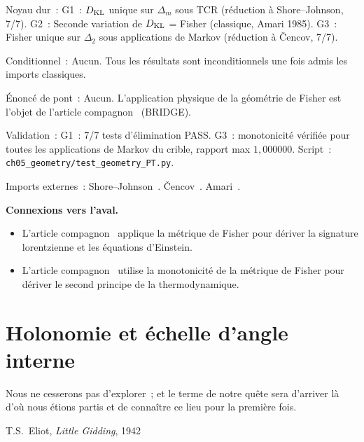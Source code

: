 \documentclass[12pt,a4paper]{article}
\begin{document}
\begin{ledgerbox}
Noyau dur~:
  G1~: $D_{\rm KL}$ unique sur $\Delta_m$ sous TCR (réduction à
  Shore--Johnson, 7/7).
  G2~: Seconde variation de $D_{\rm KL}$ = Fisher (classique,
  Amari 1985).
  G3~: Fisher unique sur $\Delta_2$ sous applications de Markov
  (réduction à \v{C}encov, 7/7).

Conditionnel~:
  Aucun. Tous les résultats sont inconditionnels une fois admis les
  imports classiques.

Énoncé de pont~:
  Aucun. L'application physique de la géométrie de Fisher est
  l'objet de l'article compagnon~\cite{companion_physics} (BRIDGE).

Validation~:
  G1~: 7/7 tests d'élimination PASS.
  G3~: monotonicité vérifiée pour toutes les applications de Markov
  du crible, rapport max $1{,}000000$.
  Script~: \texttt{ch05\_geometry/test\_geometry\_PT.py}.

Imports externes~:
  Shore--Johnson~\cite{ShoreJohnson1980}.
  \v{C}encov~\cite{Cencov1982}.
  Amari~\cite{Amari1985}.
\end{ledgerbox}

\medskip\noindent\textbf{Connexions vers l'aval.}
\begin{itemize}
\item L'article compagnon~\cite{companion_physics} applique la
  métrique de Fisher pour dériver la signature lorentzienne et les
  équations d'Einstein.
\item L'article compagnon~\cite{companion_physics} utilise la
  monotonicité de la métrique de Fisher pour dériver le second
  principe de la thermodynamique.
\end{itemize}


\newpage

\section{Holonomie et échelle d'angle interne}
\label{sec:holonomy}

\epigraph{Nous ne cesserons pas d'explorer~; et le terme de notre quête
sera d'arriver là d'où nous étions partis et de connaître ce lieu pour
la première fois.}{T.S.\ Eliot, \textit{Little Gidding}, 1942}
\end{document}

